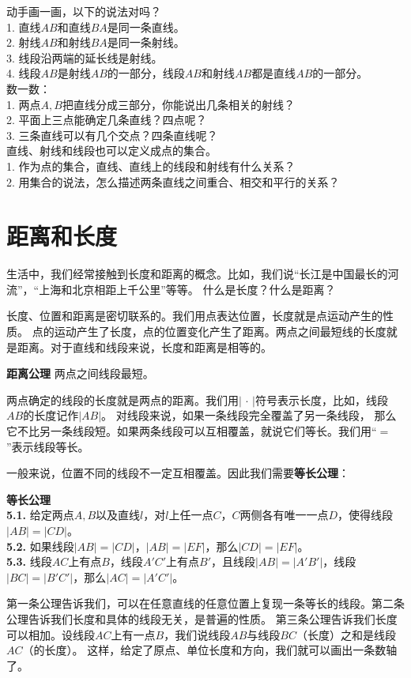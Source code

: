 \documentclass[12pt,UTF8,fontset=none]{ctexbook}
\begin{document}
\begin{sk}\label{sk:0-0-0}
    动手画一画，以下的说法对吗？\\
    1. 直线$AB$和直线$BA$是同一条直线。\\
    2. 射线$AB$和射线$BA$是同一条射线。\\
    3. 线段沿两端的延长线是射线。\\
    4. 线段$AB$是射线$AB$的一部分，线段$AB$和射线$AB$都是直线$AB$的一部分。\\
    数一数：\\
    1. 两点$A,B$把直线分成三部分，你能说出几条相关的射线？\\
    2. 平面上三点能确定几条直线？四点呢？\\
    3. 三条直线可以有几个交点？四条直线呢？\\
    直线、射线和线段也可以定义成点的集合。\\
    1. 作为点的集合，直线、直线上的线段和射线有什么关系？\\
    2. 用集合的说法，怎么描述两条直线之间重合、相交和平行的关系？
\end{sk}

\section{距离和长度}

生活中，我们经常接触到长度和距离的概念。比如，我们说“长江是中国最长的河流”，“上海和北京相距上千公里”等等。
什么是长度？什么是距离？

长度、位置和距离是密切联系的。我们用点表达位置，长度就是点运动产生的性质。
点的运动产生了长度，点的位置变化产生了距离。两点之间最短线的长度就是距离。对于直线和线段来说，长度和距离是相等的。
\begin{po}{\textbf{距离公理}}\label{po:3}
    两点之间线段最短。
\end{po}
两点确定的线段的长度就是两点的距离。我们用$ |\, \cdot\,|$符号表示长度，比如，线段$AB$的长度记作$|AB|$。
对线段来说，如果一条线段完全覆盖了另一条线段，
那么它不比另一条线段短。如果两条线段可以互相覆盖，就说它们等长。我们用“$=$”表示线段等长。

一般来说，位置不同的线段不一定互相覆盖。因此我们需要\textbf{等长公理}：
\begin{po}{\textbf{等长公理}}\label{po:4}
    \mbox{}\\
    \indent \textbf{5.1.} 给定两点$A,B$以及直线$l$，对$l$上任一点$C$，$C$两侧各有唯一一点$D$，使得线段$|AB| = |CD|$。\\
    \indent \textbf{5.2.} 如果线段$|AB| = |CD|$，$|AB| = |EF|$，那么$|CD| = |EF|$。\\
    \indent \textbf{5.3.} 线段$AC$上有点$B$，线段$A'C'$上有点$B'$，且线段$|AB| = |A'B'|$，线段$|BC| = |B'C'|$，那么$|AC| = |A'C'|$。
\end{po}
第一条公理告诉我们，可以在任意直线的任意位置上复现一条等长的线段。第二条公理告诉我们长度和具体的线段无关，是普遍的性质。
第三条公理告诉我们长度可以相加。设线段$AC$上有一点$B$，我们说线段$AB$与线段$BC$（长度）之和是线段$AC$（的长度）。
这样，给定了原点、单位长度和方向，我们就可以画出一条数轴了。
\end{document}
